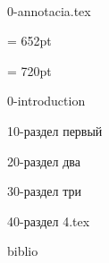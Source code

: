 \diplomTitlePage
\clearpage
\restoregeometry



\frontmatter %
\newpage ~ %


\newpage 
{0-annotacia.tex}
 

\textheight = 652pt %
\tableofcontents    %

\textheight = 720pt %







{0-introduction}


\mainmatter %


{10-раздел первый}

{20-раздел два}

{30-раздел три}

{40-раздел 4.tex}





\backmatter %
           


{biblio}




